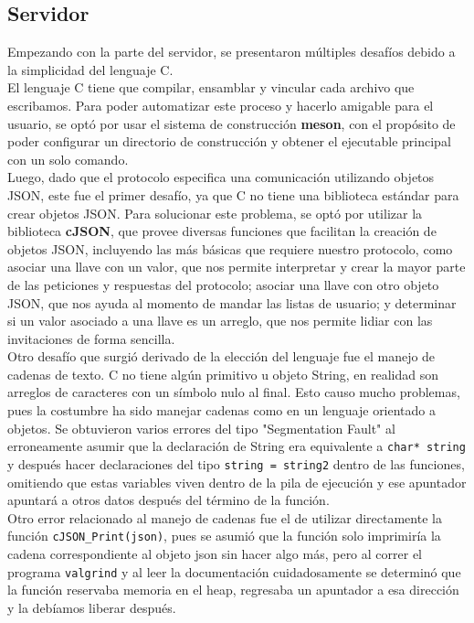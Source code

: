 \documentclass[12pt,a4paper]{article}
\begin{document}
\subsection{Servidor}
Empezando con la parte del servidor, se presentaron múltiples desafíos debido a la simplicidad del lenguaje C. \\
El lenguaje C tiene que compilar, ensamblar y vincular cada archivo que escribamos. Para poder automatizar este proceso y hacerlo amigable para el usuario, se optó por usar el sistema de construcción \textbf{meson}, con el propósito de poder configurar un directorio de construcción y obtener el ejecutable principal con un solo comando. \\ 
Luego, dado que el protocolo especifica una comunicación utilizando objetos JSON, este fue el primer desafío, ya que C no tiene una biblioteca estándar para crear objetos JSON. Para solucionar este problema, se optó por utilizar la biblioteca \textbf{cJSON}, que provee diversas funciones que facilitan la creación de objetos JSON, incluyendo las más básicas que requiere nuestro protocolo, como asociar una llave con un valor, que nos permite interpretar y crear la mayor parte de las peticiones y respuestas del protocolo; asociar una llave con otro objeto JSON, que nos ayuda al momento de mandar las listas de usuario; y determinar si un valor asociado a una llave es un arreglo, que nos permite lidiar con las invitaciones de forma sencilla. \\
Otro desafío que surgió derivado de la elección del lenguaje fue el manejo de cadenas de texto. C no tiene algún primitivo u objeto String, en realidad son arreglos de caracteres con un símbolo nulo al final. Esto causo mucho problemas, pues la costumbre ha sido manejar cadenas como en un lenguaje orientado a objetos. Se obtuvieron varios errores del tipo "Segmentation Fault" al erroneamente asumir que la declaración de String era equivalente a \texttt{char* string} y después hacer declaraciones del tipo \texttt{string = string2} dentro de las funciones, omitiendo que estas variables viven dentro de la pila de ejecución y ese apuntador apuntará a otros datos después del término de la función. \\
Otro error relacionado al manejo de cadenas fue el de utilizar directamente la función \texttt{cJSON\_Print(json)}, pues se asumió que la función solo imprimiría la cadena correspondiente al objeto json sin hacer algo más, pero al correr el programa \texttt{valgrind} y al leer la documentación cuidadosamente se determinó que la función reservaba memoria en el heap, regresaba un apuntador a esa dirección y la debíamos liberar después. \\
\end{document}
